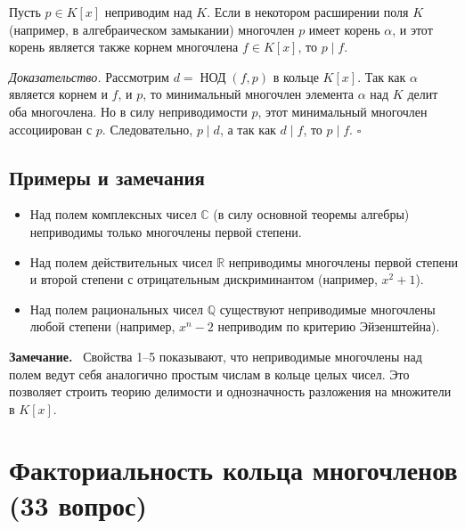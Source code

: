 \documentclass[a4paper,12pt]{article}
\newcommand{\myremark}{\textbf{Замечание.}\ }
\theoremstyle{definition}
\theoremstyle{plain}
\theoremstyle{remark}
\begin{document}
	\medskip
	\begin{tcolorbox}[colback=blue!5, colframe=blue!40!black, title=Свойство 5 (Корень и делимость)]
		Пусть \( p \in K[x] \) неприводим над \( K \). Если в некотором расширении поля \( K \) (например, в алгебраическом замыкании) многочлен \( p \) имеет корень \( \alpha \), и этот корень является также корнем многочлена \( f \in K[x] \), то \( p \mid f \).
	\end{tcolorbox}
	
	\medskip
	\textit{Доказательство.}
	Рассмотрим \( d = \operatorname{НОД}(f, p) \) в кольце \( K[x] \). Так как \( \alpha \) является корнем и \( f \), и \( p \), то минимальный многочлен элемента \( \alpha \) над \( K \) делит оба многочлена. Но в силу неприводимости \( p \), этот минимальный многочлен ассоциирован с \( p \). Следовательно, \( p \mid d \), а так как \( d \mid f \), то \( p \mid f \). \hfill \(\square\)
	
	\subsection{Примеры и замечания}
	
	\begin{itemize}
		\item Над полем комплексных чисел \( \mathbb{C} \) (в силу основной теоремы алгебры) неприводимы только многочлены первой степени.
		\item Над полем действительных чисел \( \mathbb{R} \) неприводимы многочлены первой степени и второй степени с отрицательным дискриминантом (например, \( x^2 + 1 \)).
		\item Над полем рациональных чисел \( \mathbb{Q} \) существуют неприводимые многочлены любой степени (например, \( x^n - 2 \) неприводим по критерию Эйзенштейна).
	\end{itemize}
	
	\myremark
	Свойства 1–5 показывают, что неприводимые многочлены над полем ведут себя аналогично простым числам в кольце целых чисел. Это позволяет строить теорию делимости и однозначность разложения на множители в \( K[x] \).
	
	
	
	
	
	\newpage
	\section{Факториальность кольца многочленов (33 вопрос)}
	
\end{document}
